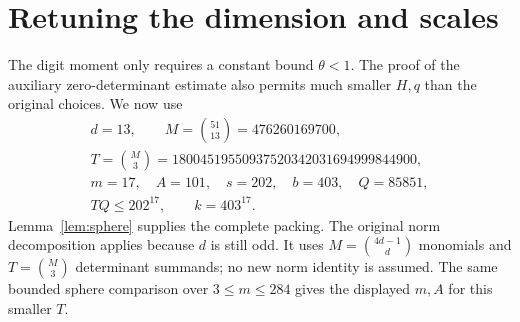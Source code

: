 \documentclass[11pt]{article}
\begin{document}
\section{Retuning the dimension and scales}\label{sec:retuned}
The digit moment only requires a constant bound \(\theta<1\).
The proof of the auxiliary zero-determinant estimate also permits much
smaller \(H,q\) than the original choices. We now use
\[
\begin{gathered}
 d=13,\qquad M=\binom{51}{13}=476260169700,\\
 T=\binom{M}{3}=18004519550937520342031694999844900,\\
 m=17,\quad A=101,\quad s=202,\quad b=403,\quad Q=85851,\\
 TQ\le202^{17},\qquad k=403^{17}.
\end{gathered}
\]
Lemma~\ref{lem:sphere} supplies the complete packing.
The original norm decomposition applies because \(d\) is still odd.
It uses \(M=\binom{4d-1}{d}\) monomials and \(T=\binom M3\)
determinant summands; no new norm identity is assumed.
The same bounded sphere comparison over \(3\le m\le284\) gives
the displayed \(m,A\) for this smaller \(T\).
\end{document}
